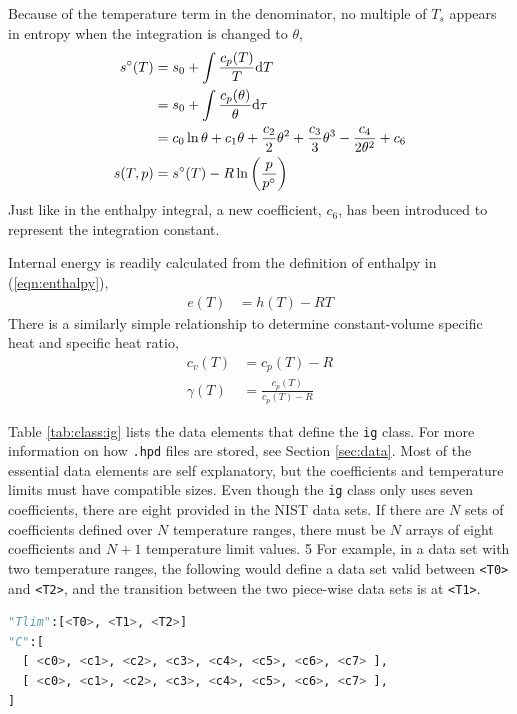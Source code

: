 Because of the temperature term in the denominator, no multiple of $T_s$ appears in entropy when the integration is changed to $\theta$,
\begin{align}
s^\circ(T) &= s_0 + \int \frac{c_p(T)}{T}\mathrm{d} T\nonumber\\
 &= s_0 + \int \frac{c_p(\theta)}{\theta}\mathrm{d} \tau\nonumber\\
 &= c_0 \ln \theta + c_1 \theta + \frac{c_2}{2} \theta^2 + \frac{c_3}{3} \theta^3 -\frac{c_4}{2\theta^2} + c_6\\
s(T,p) &= s^\circ(T) - R \ln \left( \frac{p}{p^\circ} \right)\nonumber
\end{align}
Just like in the enthalpy integral, a new coefficient, $c_6$, has been introduced to represent the integration constant.

Internal energy is readily calculated from the definition of enthalpy in (\ref{eqn:enthalpy}),
\begin{align}
e(T) &= h(T) - RT
\end{align}
There is a similarly simple relationship to determine constant-volume specific heat and specific heat ratio,
\begin{align}
c_v(T) &= c_p(T) - R\\
\gamma(T) &= \frac{c_p(T)}{c_p(T)-R}
\end{align}

Table \ref{tab:class:ig} lists the data elements that define the \texttt{ig} class.  For more information on how \texttt{.hpd} files are stored, see Section \ref{sec:data}.  Most of the essential data elements are self explanatory, but the coefficients and temperature limits must have compatible sizes.  Even though the \texttt{ig} class only uses seven coefficients, there are eight provided in the NIST data sets.  If there are $N$ sets of coefficients defined over $N$ temperature ranges, there must be $N$ arrays of eight coefficients and $N+1$ temperature limit values.
5
For example, in a data set with two temperature ranges, the following would define a data set valid between \texttt{<T0>} and \texttt{<T2>}, and the transition between the two piece-wise data sets is at \texttt{<T1>}.
\begin{lstlisting}[language=Python]
"Tlim":[<T0>, <T1>, <T2>]
"C":[
  [ <c0>, <c1>, <c2>, <c3>, <c4>, <c5>, <c6>, <c7> ],
  [ <c0>, <c1>, <c2>, <c3>, <c4>, <c5>, <c6>, <c7> ],
]
\end{lstlisting}

